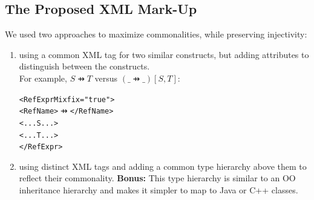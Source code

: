\documentclass[%
   slidesonly,%
   semhelv,%
   landscape]{seminar}
\begin{document}
\begin{slide}
\section{The Proposed XML Mark-Up}

We used two approaches to maximize commonalities, while 
preserving injectivity:
\begin{enumerate}
\item using a common XML tag for two similar constructs, but adding
  attributes to distinguish between the constructs.  
  \\
  For example, $S \pfun T$ versus $(\_ \pfun \_)[S,T]$:
\newcommand{\PFUN}{$\pfun$}
\begin{small}
\begin{alltt}
  <RefExpr Mixfix="true">
    <RefName>\PFUN</RefName>
    <... S ...>
    <... T ...>
  </RefExpr>  
\end{alltt}
\end{small}
\item using distinct XML tags and adding a common type hierarchy above
  them to reflect their commonality.  \textbf{Bonus:} This type hierarchy
  is similar to an OO inheritance hierarchy and makes it simpler to
  map to Java or C++ classes.
\end{enumerate}
\end{slide}
\end{document}
